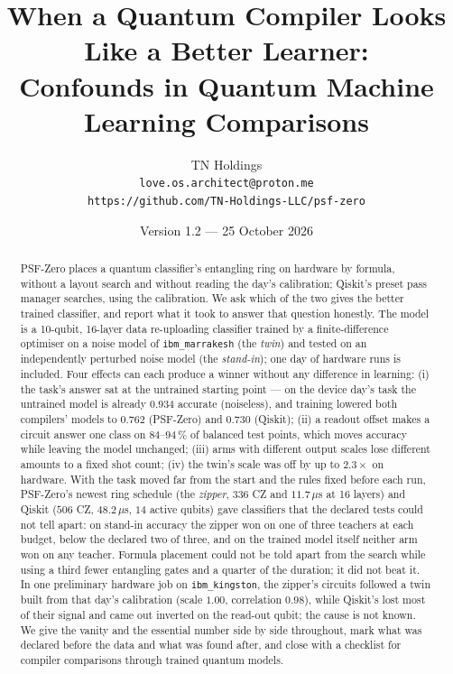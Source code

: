 \documentclass[11pt]{article}
\title{When a Quantum Compiler Looks Like a Better Learner:\\
Confounds in Quantum Machine Learning Comparisons}
\author{TN Holdings\\
\texttt{love.os.architect@proton.me}\\
\texttt{https://github.com/TN-Holdings-LLC/psf-zero}}
\date{Version 1.2 --- 25 October 2026}
\begin{document}
\maketitle

\begin{abstract}
PSF-Zero places a quantum classifier's entangling ring on hardware by formula, without a layout search and without
reading the day's calibration; Qiskit's preset pass manager searches, using the calibration. We ask which of the two
gives the better trained classifier, and report what it took to answer that question honestly. The model is a
10-qubit, 16-layer data re-uploading classifier trained by a finite-difference optimiser on a noise model of
\texttt{ibm\_marrakesh} (the \emph{twin}) and tested on an independently perturbed noise model (the \emph{stand-in});
one day of hardware runs is included. Four effects can each produce a winner without any difference in learning:
(i) the task's answer sat at the untrained starting point --- on the device day's task the untrained model is already
$0.934$ accurate (noiseless), and training lowered both compilers' models to $0.762$ (PSF-Zero) and $0.730$ (Qiskit);
(ii) a readout offset makes a circuit answer one class on $84$--$94\,\%$ of balanced test points, which moves accuracy
while leaving the model unchanged; (iii) arms with different output scales lose different amounts to a fixed shot
count; (iv) the twin's scale was off by up to $2.3\times$ on hardware. With the task moved far from the start and the
rules fixed before each run, PSF-Zero's newest ring schedule (the \emph{zipper}, $336$ CZ and $11.7\,\mu$s at 16
layers) and Qiskit ($506$ CZ, $48.2\,\mu$s, $14$ active qubits) gave classifiers that the declared tests could not tell
apart: on stand-in accuracy the zipper won on one of three teachers at each budget, below the declared two of
three, and on the trained model itself neither arm won on any teacher. Formula placement could not be told apart from the search while using a third fewer entangling gates and a
quarter of the duration; it did not beat it. In one preliminary hardware job on \texttt{ibm\_kingston}, the zipper's
circuits followed a twin built from that day's calibration (scale $1.00$, correlation $0.98$), while Qiskit's lost most
of their signal and came out inverted on the read-out qubit; the cause is not known. We give the vanity and the essential number side by side throughout, mark what was
declared before the data and what was found after, and close with a checklist for compiler comparisons through
trained quantum models.
\end{abstract}
\end{document}
